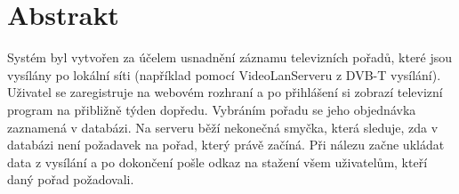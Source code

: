 \documentclass[11pt,twoside,a4paper]{dp_format}%
\begin{document}
\chapter*{Abstrakt}
Systém byl vytvořen za účelem usnadnění záznamu televizních pořadů, které jsou vysílány po lokální síti (například pomocí VideoLanServeru z DVB-T vysílání). Uživatel se zaregistruje na webovém rozhraní a po přihlášení si zobrazí televizní program na přibližně týden dopředu. Vybráním pořadu se jeho objednávka zaznamená v databázi. Na serveru běží nekonečná smyčka, která sleduje, zda v databázi není požadavek na pořad, který právě začíná. Při nálezu začne ukládat data z vysílání a po dokončení pošle odkaz na stažení všem uživatelům, kteří daný pořad požadovali.
\cleardoublepage%

\tableofcontents
\cleardoublepage%

\listoffigures
{}
\cleardoublepage%

\listoftables
{}
\cleardoublepage%

\mainbodystarts







\cleardoublepage




\cleardoublepage

\appendix

\cleardoublepage


\cleardoublepage
\end{document}
